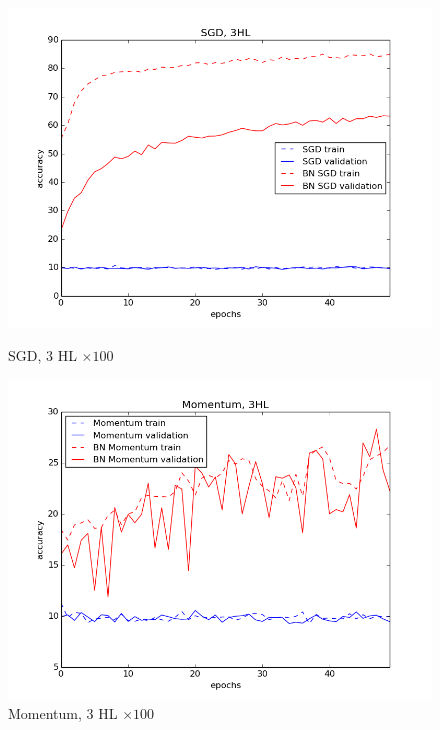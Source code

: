 \documentclass[12pt,oneside]{article}
\begin{document}
\begin{figure}[h!]
\begin{minipage}{0.45\textwidth}
\end{minipage} \vfill
\begin{minipage}{0.45\textwidth}
\includegraphics[scale=0.38]{images/clSgd.png}
\caption{\small SGD, $3$ HL $\times 100$}
\end{minipage} \hfill
\begin{minipage}{0.45\textwidth}
\includegraphics[scale=0.38]{images/clMomentum.png}
\caption{\small Momentum, $3$ HL $\times 100$}
\end{minipage}
\begin{minipage}{0.45\textwidth}

\end{minipage}
\end{figure}
\end{document}
